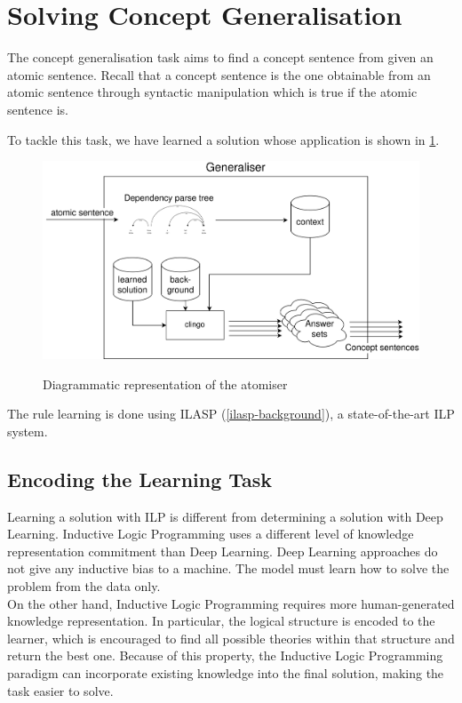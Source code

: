 \section{Solving Concept Generalisation}
\label{solving-generalisation-task}

The concept generalisation task aims to find a concept sentence from given an atomic sentence.
Recall that a concept sentence is the one obtainable from an atomic sentence through syntactic manipulation which is true if the atomic sentence is.

To tackle this task, we have learned a solution whose application is shown in \ref{generalisation-diagram}.

\begin{figure}[h]
\caption{Diagrammatic representation of the atomiser}
\vspace{5pt}
\centering
\includegraphics[width=\textwidth]{solving-nlp-tasks-logically/Generalisation Diagram.png}
\label{generalisation-diagram}
\end{figure}

The rule learning is done using ILASP (\ref{ilasp-background}), a state-of-the-art ILP system.

\subsection{Encoding the Learning Task}
\label{encoding-the-learning-task}

Learning a solution with ILP is different from determining a solution with Deep Learning.
Inductive Logic Programming uses a different level of knowledge representation commitment than Deep Learning.
Deep Learning approaches do not give any inductive bias to a machine. 
The model must learn how to solve the problem from the data only. \\
On the other hand, Inductive Logic Programming requires more human-generated knowledge representation.
In particular, the logical structure is encoded to the learner, which is encouraged to find all possible theories within that structure and return the best one. 
Because of this property, the Inductive Logic Programming paradigm can incorporate existing knowledge into the final solution, making the task easier to solve.


